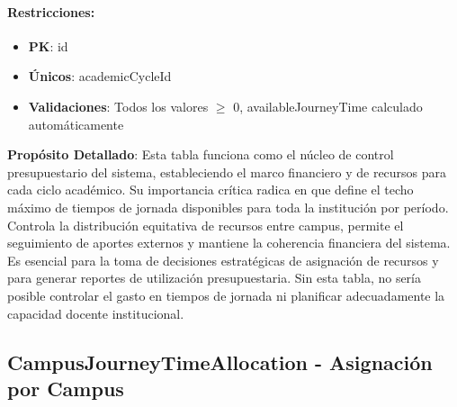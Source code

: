 \documentclass[11pt,a4paper]{article}
\begin{document}
\paragraph{Restricciones:}
\begin{itemize}
    \item \textbf{PK}: id
    \item \textbf{Únicos}: academicCycleId
    \item \textbf{Validaciones}: Todos los valores $\geq$ 0, availableJourneyTime calculado automáticamente
\end{itemize}

\vspace{0.5cm}

\textbf{Propósito Detallado}: Esta tabla funciona como el núcleo de control presupuestario del sistema, estableciendo el marco financiero y de recursos para cada ciclo académico. Su importancia crítica radica en que define el techo máximo de tiempos de jornada disponibles para toda la institución por período. Controla la distribución equitativa de recursos entre campus, permite el seguimiento de aportes externos y mantiene la coherencia financiera del sistema. Es esencial para la toma de decisiones estratégicas de asignación de recursos y para generar reportes de utilización presupuestaria. Sin esta tabla, no sería posible controlar el gasto en tiempos de jornada ni planificar adecuadamente la capacidad docente institucional.

{\color{darkblue}\Large\subsection{CampusJourneyTimeAllocation - Asignación por Campus}}
\end{document}
